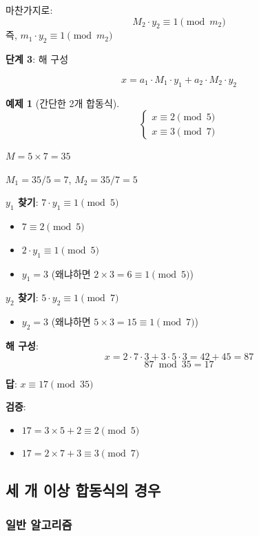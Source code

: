 \documentclass[11pt,a4paper]{article}
\theoremstyle{definition}
\newtheorem{example}[theorem]{예제}
\theoremstyle{remark}
\begin{document}
마찬가지로:
\[M_2 \cdot y_2 \equiv 1 \pmod{m_2}\]
즉, $m_1 \cdot y_2 \equiv 1 \pmod{m_2}$

\textbf{단계 3}: 해 구성

\[x = a_1 \cdot M_1 \cdot y_1 + a_2 \cdot M_2 \cdot y_2\]

\begin{example}[간단한 2개 합동식]
\[\begin{cases}
x \equiv 2 \pmod{5} \\
x \equiv 3 \pmod{7}
\end{cases}\]

$M = 5 \times 7 = 35$

$M_1 = 35/5 = 7$, $M_2 = 35/7 = 5$

\textbf{$y_1$ 찾기}: $7 \cdot y_1 \equiv 1 \pmod{5}$
\begin{itemize}
    \item $7 \equiv 2 \pmod{5}$
    \item $2 \cdot y_1 \equiv 1 \pmod{5}$
    \item $y_1 = 3$ (왜냐하면 $2 \times 3 = 6 \equiv 1 \pmod{5}$)
\end{itemize}

\textbf{$y_2$ 찾기}: $5 \cdot y_2 \equiv 1 \pmod{7}$
\begin{itemize}
    \item $y_2 = 3$ (왜냐하면 $5 \times 3 = 15 \equiv 1 \pmod{7}$)
\end{itemize}

\textbf{해 구성}:
\[x = 2 \cdot 7 \cdot 3 + 3 \cdot 5 \cdot 3 = 42 + 45 = 87\]
\[87 \bmod 35 = 17\]

\textbf{답}: $x \equiv 17 \pmod{35}$

\textbf{검증}:
\begin{itemize}
    \item $17 = 3 \times 5 + 2 \equiv 2 \pmod{5}$ \checkmark
    \item $17 = 2 \times 7 + 3 \equiv 3 \pmod{7}$ \checkmark
\end{itemize}
\end{example}

\subsection{세 개 이상 합동식의 경우}

\subsubsection{일반 알고리즘}
\end{document}
